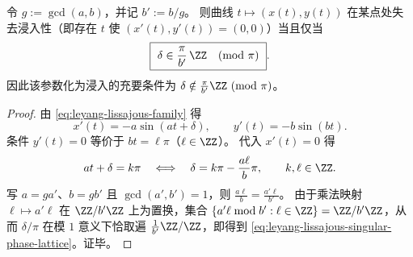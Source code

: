 \begin{theorem}[参数奇异点的判别与浸入条件]\label{thm:leyang-lissajous-immersion-criterion}
令 \(g:=\gcd(a,b)\)，并记 \(b':=b/g\)。
则曲线 \(t\mapsto (x(t),y(t))\) 在某点处失去浸入性（即存在 \(t\) 使 \((x'(t),y'(t))=(0,0)\)）当且仅当
\begin{equation}\label{eq:leyang-lissajous-singular-phase-lattice}
\boxed{\ \delta\in \frac{\pi}{b'}\,\ZZ\quad(\mathrm{mod}\ \pi)\ }.
\end{equation}
因此该参数化为浸入的充要条件为 \(\delta\notin \frac{\pi}{b'}\ZZ\ (\mathrm{mod}\ \pi)\)。
\end{theorem}
\begin{proof}
由 \eqref{eq:leyang-lissajous-family} 得
\[
x'(t)=-a\sin(at+\delta),\qquad y'(t)=-b\sin(bt).
\]
条件 \(y'(t)=0\) 等价于 \(bt=\ell\pi\)（\(\ell\in\ZZ\)）。
代入 \(x'(t)=0\) 得
\[
at+\delta=k\pi
\quad\Longleftrightarrow\quad
\delta=k\pi-\frac{a\ell}{b}\pi,
\qquad k,\ell\in\ZZ.
\]
写 \(a=ga'\)、\(b=gb'\) 且 \(\gcd(a',b')=1\)，则 \(\frac{a\ell}{b}=\frac{a'\ell}{b'}\)。
由于乘法映射 \(\ell\mapsto a'\ell\) 在 \(\ZZ/b'\ZZ\) 上为置换，集合 \(\{a'\ell\bmod b':\ell\in\ZZ\}=\ZZ/b'\ZZ\)，从而
\(
\delta/\pi
\)
在模 \(1\) 意义下恰取遍 \(\frac{1}{b'}\ZZ/\ZZ\)，即得到 \eqref{eq:leyang-lissajous-singular-phase-lattice}。证毕。
\end{proof}

